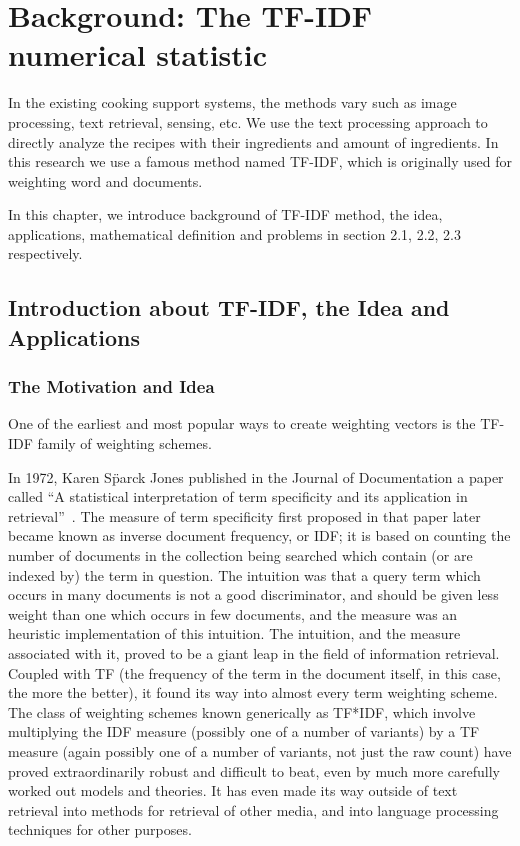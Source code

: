 \chapter{Background: The TF-IDF numerical statistic }\label{chap:bg}

In the existing cooking support systems, the methods vary such as image processing, text retrieval, sensing, etc. We use the text processing approach to directly analyze the recipes with their ingredients and amount of ingredients. In this research we use a famous method named TF-IDF, which is originally used for weighting word and documents. 

In this chapter, we introduce background of TF-IDF method, the idea, applications, mathematical definition and problems in section 2.1, 2.2, 2.3 respectively.  

\clearpage
\section{Introduction about TF-IDF, the Idea and Applications}\label{sec:bg_intro}

\subsection{The Motivation and Idea}
One of the earliest and most popular ways to create weighting vectors is the TF-IDF family of weighting schemes.  

In 1972, Karen Sp̈arck Jones published in the Journal of Documentation a paper called ``A statistical interpretation of term specificity and its application in retrieval''~\cite{Jones72astatistical}. The measure of term specificity first proposed in that paper later became known as inverse document frequency, or IDF; it is based on counting the number of documents in the collection being searched which contain (or are indexed by) the term in question. The intuition was that a query term which occurs in many documents is not a good discriminator, and should be given less weight than one which occurs in few documents, and the measure was an heuristic implementation of this intuition.
The intuition, and the measure associated with it, proved to be a giant leap in the field of information retrieval. Coupled with TF (the frequency of the term in the document itself, in this case, the more the better), it found its way into almost every term weighting scheme.
The class of weighting schemes known generically as TF*IDF, which involve multiplying the IDF measure (possibly one of a number of variants) by a TF measure (again possibly one of
a number of variants, not just the raw count) have proved extraordinarily robust and difficult to beat, even by much more carefully worked out models and theories. It has even made
its way outside of text retrieval into methods for retrieval of other media, and into language processing techniques for other purposes.

